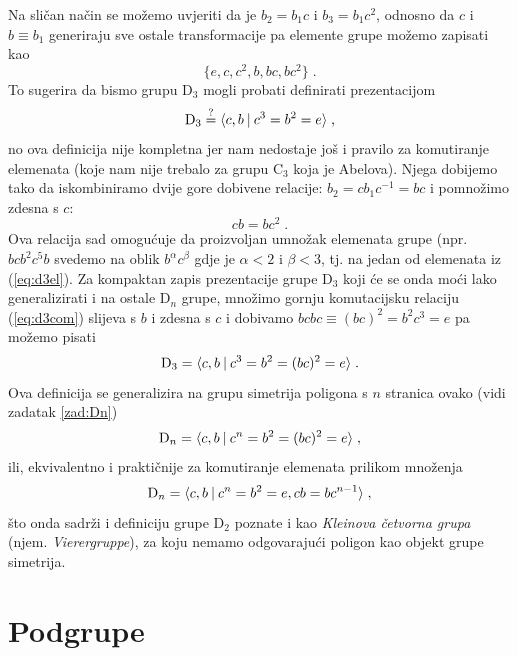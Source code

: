 Na sličan način se možemo uvjeriti da je $b_2 = b_1 c $
i $b_3 = b_1 c^2 $, odnosno da 
$c$ i $b\equiv b_1$ generiraju sve ostale transformacije pa
elemente grupe možemo zapisati kao
\begin{equation}
 \{e,c,c^2,b,bc,bc^2\} \;.
\label{eq:d3el}
\end{equation}
To sugerira da bismo grupu D$_3$ mogli probati definirati prezentacijom
\begin{equation}
    {\rm D}_3 \stackrel{?}{=} \langle c, b \: | \: c^3 = b^2 = e \rangle \;,
\label{eq:d3gp1}
\end{equation}
no ova definicija nije kompletna jer nam nedostaje još
i pravilo za komutiranje elemenata (koje nam nije trebalo
za grupu C$_3$ koja je Abelova). Njega dobijemo tako da
iskombiniramo dvije gore dobivene relacije: 
$b_2 = c b_1 c^{-1} = b c$ i pomnožimo zdesna s $c$:
\begin{equation}
c b = b c^2  \;.
\label{eq:d3com}
\end{equation}
Ova relacija sad omogućuje da proizvoljan umnožak elemenata
grupe (npr. $b c b^2 c^5 b$ svedemo na oblik $b^\alpha c^\beta$ gdje
je $\alpha<2$ i $\beta<3$, tj. na jedan od elemenata iz (\ref{eq:d3el}).
Za kompaktan zapis prezentacije grupe D$_3$ koji će se onda moći
lako generalizirati i na ostale D$_n$ grupe, množimo gornju
komutacijsku relaciju (\ref{eq:d3com}) slijeva s $b$ i zdesna s $c$
i dobivamo  $ bcbc \equiv (bc)^2 = b^2 c^3 = e$ pa možemo
pisati
\begin{equation}
 {\rm D}_3= \langle c,b \: | \: c^3 = b^2 = (bc)^2 = e \rangle \;.
\label{eq:d3gp}
\end{equation}
Ova definicija se generalizira na grupu simetrija poligona s $n$
stranica ovako (vidi zadatak \ref{zad:Dn})
\begin{equation}
 {\rm D}_n= \langle c,b \: | \: c^n = b^2 = (bc)^2 = e \rangle \;,
\label{eq:dngp}
\end{equation}
ili, ekvivalentno i praktičnije za komutiranje elemenata prilikom množenja
\begin{equation}
    {\rm D}_n= \langle c,b \: | \: c^n = b^2 = e, cb = b c^{n-1} \rangle \;,
\label{eq:dngpcom}
\end{equation}
što onda sadrži i definiciju grupe
D$_2$ poznate i kao
\emph{Kleinova četvorna grupa} (njem. \emph{Vierergruppe}), 
za koju nemamo odgovarajući poligon kao objekt grupe simetrija.


\section{Podgrupe}

